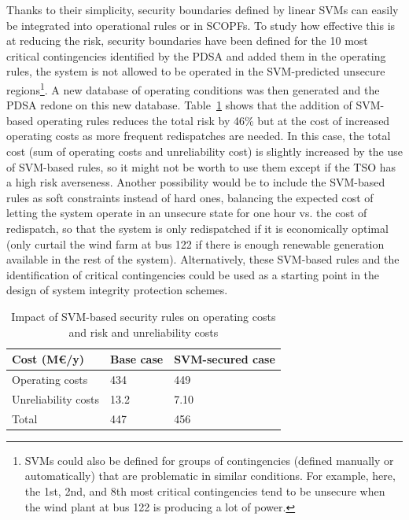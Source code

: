 Thanks to their simplicity, security boundaries defined by linear SVMs can easily be integrated into operational rules or in SCOPFs. To study how effective this is at reducing the risk, security boundaries have been defined for the 10 most critical contingencies identified by the PDSA and added them in the operating rules, \ie the system is not allowed to be operated in the SVM-predicted unsecure regions\footnote{SVMs could also be defined for groups of contingencies (defined manually or automatically) that are problematic in similar conditions. For example, here, the 1st, 2nd, and 8th most critical contingencies tend to be unsecure when the wind plant at bus 122 is producing a lot of power.}. A new database of operating conditions was then generated and the PDSA redone on this new database. Table~\ref{tab:enhancement} shows that the addition of SVM-based operating rules reduces the total risk by 46\% but at the cost of increased operating costs as more frequent redispatches are needed. In this case, the total cost (sum of operating costs and unreliability cost) is slightly increased by the use of SVM-based rules, so it might not be worth to use them except if the TSO has a high risk averseness. Another possibility would be to include the SVM-based rules as soft constraints instead of hard ones, \ie balancing the expected cost of letting the system operate in an unsecure state for one hour vs. the cost of redispatch, so that the system is only redispatched if it is economically optimal (\eg only curtail the wind farm at bus 122 if there is enough renewable generation available in the rest of the system). Alternatively, these SVM-based rules and the identification of critical contingencies could be used as a starting point in the design of system integrity protection schemes.

\begin{table}
  \centering
  \caption{Impact of SVM-based security rules on operating costs and risk and unreliability costs}
  \label{tab:enhancement}
  \begin{tabular}{@{}lll@{}}
  \toprule
  Cost (M€/y) & Base case & SVM-secured case \\ \midrule
  Operating costs     & 434 & 449 \\
  Unreliability costs & 13.2  & 7.10 \\
  Total              & 447 & 456  \\ \bottomrule
  \end{tabular}
\end{table}

